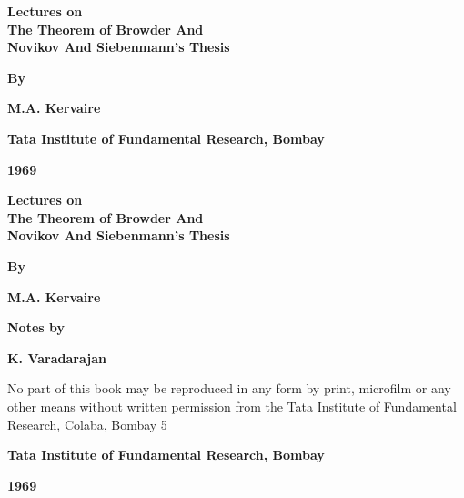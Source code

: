 \thispagestyle{empty}

\begin{center}
{\Large\bf Lectures on}\\[5pt]
{\Large\bf The Theorem of Browder And}\\[5pt]
{\Large\bf Novikov And Siebenmann's Thesis}\\
\vskip 1cm


{\bf By}
\medskip

{\large\bf M.A. Kervaire}
\vfill


{\bf Tata Institute of Fundamental Research, Bombay}

{\bf 1969}

\end{center}

\eject

\thispagestyle{empty}
\begin{center}
{\Large\bf Lectures on}\\[5pt]
{\Large\bf The Theorem of Browder And}\\[5pt]
{\Large\bf Novikov And Siebenmann's Thesis}\\
\vskip 1cm


{\bf By}
\medskip

{\large\bf M.A. Kervaire}
\vfill

{\bf Notes by}
\medskip

{\large\bf K. Varadarajan}
\vfill

\parbox{0.7\textwidth}{No part of this book may be reproduced
in any form by print, microfilm or any
other means without written permission 
from the Tata Institute of Fundamental
Research, Colaba, Bombay 5}
\vfill

{\bf Tata Institute of Fundamental Research, Bombay}


{\bf 1969}

\end{center}
